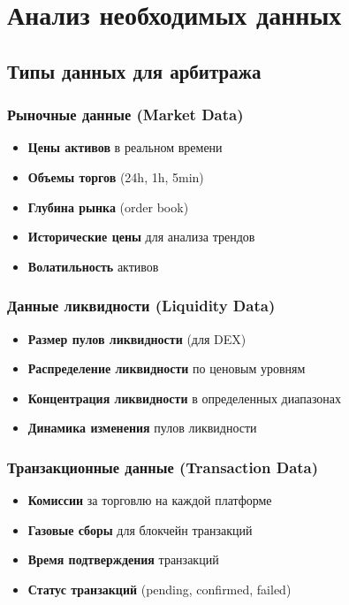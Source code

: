 \documentclass[a4paper,11pt]{article}
\begin{document}
\newpage

\section{Анализ необходимых данных}

\subsection{Типы данных для арбитража}

\subsubsection{Рыночные данные (Market Data)}
\begin{itemize}
    \item \textbf{Цены активов} в реальном времени
    \item \textbf{Объемы торгов} (24h, 1h, 5min)
    \item \textbf{Глубина рынка} (order book)
    \item \textbf{Исторические цены} для анализа трендов
    \item \textbf{Волатильность} активов
\end{itemize}

\subsubsection{Данные ликвидности (Liquidity Data)}
\begin{itemize}
    \item \textbf{Размер пулов ликвидности} (для DEX)
    \item \textbf{Распределение ликвидности} по ценовым уровням
    \item \textbf{Концентрация ликвидности} в определенных диапазонах
    \item \textbf{Динамика изменения} пулов ликвидности
\end{itemize}

\subsubsection{Транзакционные данные (Transaction Data)}
\begin{itemize}
    \item \textbf{Комиссии} за торговлю на каждой платформе
    \item \textbf{Газовые сборы} для блокчейн транзакций
    \item \textbf{Время подтверждения} транзакций
    \item \textbf{Статус транзакций} (pending, confirmed, failed)
\end{itemize}
\end{document}
